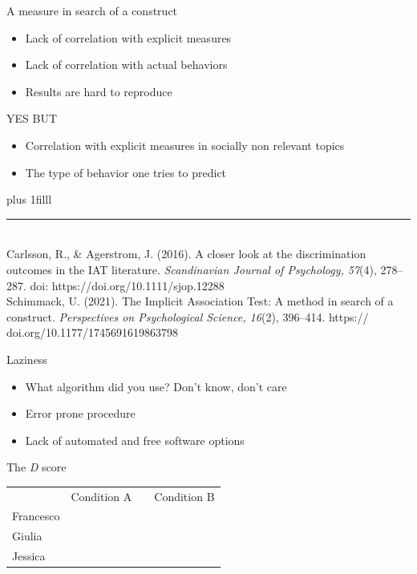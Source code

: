\documentclass{beamer}
\begin{document}
\begin{frame}{A measure in search of a construct}
	\begin{itemize}
		\item Lack of correlation with explicit measures
		\item Lack of correlation with actual behaviors
		\item Results are hard to reproduce
	\end{itemize}

\begin{center}
	YES BUT
\end{center}

\begin{itemize}
\item Correlation with explicit measures in socially non relevant topics
\item The type of behavior one tries to predict
\end{itemize}

\vskip0pt plus 1filll

\color{template}\rule{0.30\linewidth}{0.5pt}\\
\color{black}
\footnotesize{Carlsson, R., \& Agerstrom, J. (2016). A closer look at the discrimination outcomes in the IAT literature. \emph{Scandinavian Journal of Psychology, 57}(4), 278–287. doi:
	https://doi.org/10.1111/sjop.12288\\
Schimmack, U. (2021). The Implicit Association Test:
A method in search of a construct. \emph{Perspectives on
Psychological Science, 16}(2), 396–414. https://
doi.org/10.1177/1745691619863798}
\end{frame}

\begin{frame}{Laziness}
	\begin{itemize}
		\item What algorithm did you use? Don't know, don't care
		\item Error prone procedure
		\item Lack of automated and free software options
	\end{itemize}
\end{frame}

\begin{frame}{The \emph{D} score}
	\centering
		\begin{tabular}{l l l l l l l l}
		& \multicolumn{3}{c}{Condition A} & & \multicolumn{3}{c}{Condition B}\\
		Francesco & \Cat[2] & \Snowman[2] & \NiceReapey[2] & & \Cat[2] & \Snowman[2] & \NiceReapey[2] \\
		Giulia & \Cat[2] & \Snowman[2] & \NiceReapey[2] & & \Cat[2] & \Snowman[2] & \NiceReapey[2] \\
		Jessica & \Cat[2] & \Snowman[2] & \NiceReapey[2] & & \Cat[2] & \Snowman[2] & \NiceReapey[2] \\
	\end{tabular}
\end{frame}
\end{document}
